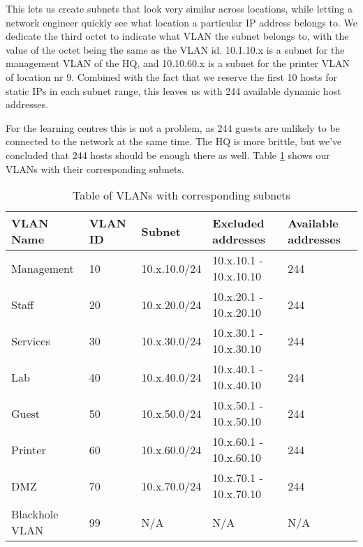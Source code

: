 This lets us create subnets that look very similar across locations, while letting a network engineer quickly see what location a particular IP address belongs to. We dedicate the third octet to indicate what VLAN the subnet belongs to, with the value of the octet being the same as the VLAN id. 10.1.10.x is a subnet for the management VLAN of the HQ, and 10.10.60.x is a subnet for the printer VLAN of location nr 9. Combined with the fact that we reserve the first 10 hosts for static IPs in each subnet range, this leaves us with 244 available dynamic host addresses.

For the learning centres this is not a problem, as 244 guests are unlikely to be connected to the network at the same time. The HQ is more brittle, but we've concluded that 244 hosts should be enough there as well. Table \ref{VLANsubnettable} shows our VLANs with their corresponding subnets.


\begin{table}[H]
\caption{Table of VLANs with corresponding subnets}
\label{VLANsubnettable}
\begin{tabular}{|l|l|l|l|l|}
\hline
\textbf{VLAN Name} & \textbf{VLAN ID} & \textbf{Subnet} & \textbf{Excluded addresses} & \textbf{Available addresses} \\ \hline

Management     & 10      & 10.x.10.0/24 & 10.x.10.1 - 10.x.10.10 & 244 \\ \hline
Staff          & 20      & 10.x.20.0/24 & 10.x.20.1 - 10.x.20.10 & 244 \\ \hline
Services       & 30      & 10.x.30.0/24 & 10.x.30.1 - 10.x.30.10 & 244 \\ \hline
Lab            & 40      & 10.x.40.0/24 & 10.x.40.1 - 10.x.40.10 & 244 \\ \hline
Guest          & 50      & 10.x.50.0/24 & 10.x.50.1 - 10.x.50.10 & 244 \\ \hline
Printer        & 60      & 10.x.60.0/24 & 10.x.60.1 - 10.x.60.10 & 244 \\ \hline
DMZ            & 70      & 10.x.70.0/24 & 10.x.70.1 - 10.x.70.10 & 244 \\ \hline
Blackhole VLAN & 99      & N/A          & N/A                    & N/A \\ \hline
\end{tabular}
\end{table}

